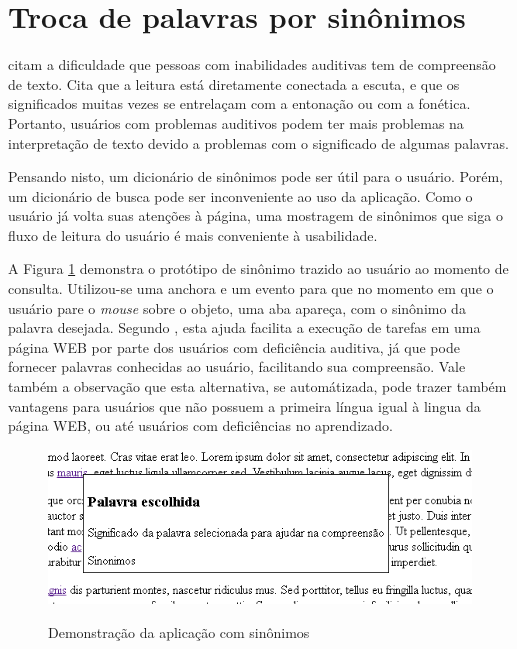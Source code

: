 \documentclass[
	12pt,				%
	oneside,			%
	a4paper,			%
	english,			%
	brazil				%
	]{abntex2ppgsi}
\begin{document}
\section{Troca de palavras por sinônimos}

 citam a dificuldade que pessoas com inabilidades auditivas tem de compreensão de texto. Cita que a leitura está diretamente conectada a escuta, e que os significados muitas vezes se entrelaçam com a entonação ou com a fonética. Portanto, usuários com problemas auditivos podem ter mais problemas na interpretação de texto devido a problemas com o significado de algumas palavras.

Pensando nisto, um dicionário de sinônimos pode ser útil para o usuário. Porém, um dicionário de busca pode ser inconveniente ao uso da aplicação. Como o usuário já volta suas atenções à página, uma mostragem de sinônimos que siga o fluxo de leitura do usuário é mais conveniente à usabilidade. 

A Figura \ref{fig:prototipoSinonimo} demonstra o  protótipo de sinônimo trazido ao usuário ao momento de consulta. Utilizou-se uma anchora e um evento para que no momento em que o usuário pare o \textit{mouse} sobre o objeto, uma aba apareça, com o sinônimo da palavra desejada. Segundo , esta ajuda facilita a execução de tarefas em uma página WEB por parte dos usuários com deficiência auditiva, já que pode fornecer palavras conhecidas ao usuário, facilitando sua compreensão. Vale também a observação que esta alternativa, se automátizada, pode trazer também vantagens para usuários que não possuem a primeira língua igual à lingua da página WEB, ou até usuários com deficiências no aprendizado.

\begin{figure}[htbp]
	\centering
	\caption{Demonstração da aplicação com sinônimos}
	\includegraphics{prototipoCego.png}
	\label{fig:prototipoSinonimo}

\end{figure}
\end{document}
